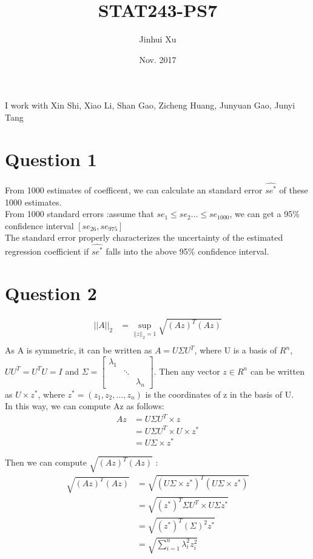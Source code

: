 \documentclass{article}\usepackage[]{graphicx}\usepackage[]{color}
\begin{document}
 
\title{STAT243-PS7}
\author{Jinhui Xu}
\date{Nov. 2017}

\maketitle


I work with Xin Shi, Xiao Li, Shan Gao, Zicheng Huang, Junyuan Gao, Junyi Tang

\section{Question 1}

From 1000 estimates of coefficent, we can calculate an standard error $\hat{se^*}$ of these 1000 estimates.\\
From 1000 standard errors :assume that $se_1\leq se_2...\leq se_{1000}$, we can get a 95\% confidence interval $[se_{26},se_{975}]$ \\
The standard error properly characterizes the uncertainty of the estimated regression coefficient if $\hat{se^*}$ falls into the above 95\% confidence interval.

\section{Question 2}
\begin{align*}
  ||A||_2&=\sup_{||z||_2=1}\sqrt{(Az)^T(Az)}\\
  \end{align*}
As A is symmetric, it can be written as $A=U\Sigma U^T$, where U is a basis of $R^n$, $UU^T=U^TU=I$ and $\Sigma=\begin{bmatrix}\lambda_1&&\\&\ddots&\\&&\lambda_n\end{bmatrix}$. Then any vector $z\in R^n$ can be written as $U\times z^*$, where $z^*=(z_1,z_2,...,z_n)$ is the coordinates of z in the basis of U.\\
In this way, we can compute Az as follows:\\
\begin{align*}
  Az&=U\Sigma U^T \times z\\
    &=U\Sigma U^T \times U\times z^*\\
    &=U\Sigma \times z^*
  \end{align*}
  
  
Then we can compute $\sqrt{(Az)^T(Az)}$ :\\
\begin{align*}
  \sqrt{(Az)^T(Az)}&=\sqrt{(U\Sigma \times z^*)^T(U\Sigma \times z^*)}\\
                   &=\sqrt{(z^*)^T\Sigma U^T\times U\Sigma z^*}\\
                   &=\sqrt{(z^*)^T(\Sigma)^2z^*}\\
                   &=\sqrt{\sum_{i=1}^{n}\lambda_i^2z_i^2}
  \end{align*}
\end{document}
